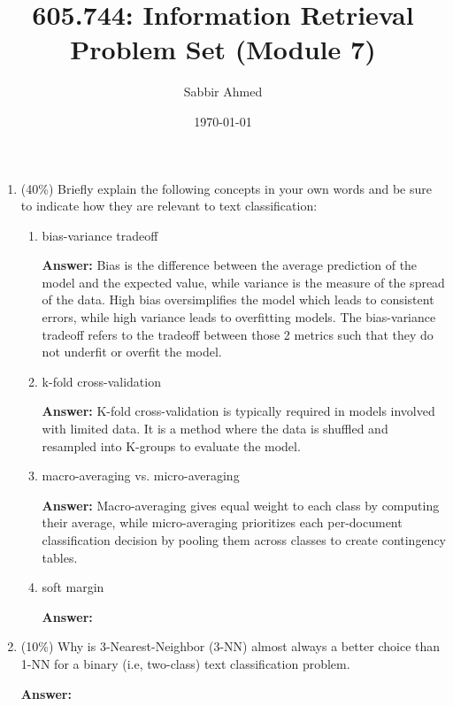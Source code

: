 \documentclass[11pt]{article}
\title{605.744: Information Retrieval \\ Problem Set (Module 7)}
\author{Sabbir Ahmed}
\date{\today}
\begin{document}
\maketitle

    \begin{enumerate}

        \item (40\%) Briefly explain the following concepts in your own words and be sure to indicate how they are relevant to text classification:
        
        \begin{enumerate}
            \item bias-variance tradeoff

            \textbf{Answer:} Bias is the difference between the average prediction of the model and the expected value, while variance is the measure of the spread of the data. High bias oversimplifies the model which leads to consistent errors, while high variance leads to overfitting models. The bias-variance tradeoff refers to the tradeoff between those 2 metrics such that they do not underfit or overfit the model.

            \item k-fold cross-validation

            \textbf{Answer:} K-fold cross-validation is typically required in models involved with limited data. It is a method where the data is shuffled and resampled into K-groups to evaluate the model.

            \item macro-averaging vs. micro-averaging

            \textbf{Answer:} Macro-averaging gives equal weight to each class by computing their average, while micro-averaging prioritizes each per-document classification decision by pooling them across classes to create contingency tables.

            \item soft margin

            \textbf{Answer:} 

        \end{enumerate}

        \item (10\%) Why is 3-Nearest-Neighbor (3-NN) almost always a better choice than 1-NN for a binary (i.e, two-class) text classification problem.

        \textbf{Answer:}


\end{enumerate}
\end{document}
